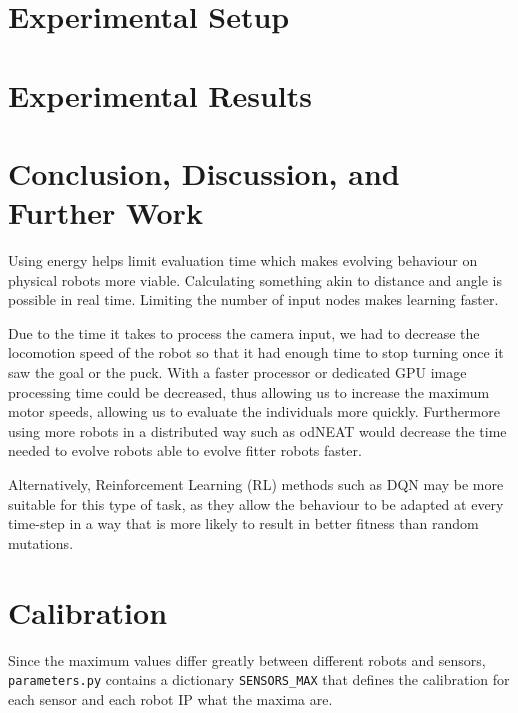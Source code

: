 \documentclass{article}
\begin{document}

	\section{Experimental Setup} %
	\label{sec:setup}


	\section{Experimental Results} %
	\label{sec:results}
	

	\section{Conclusion, Discussion, and Further Work} %
	\label{sec:conclusion}
	Using energy helps limit evaluation time which makes evolving behaviour on
	physical robots more viable.
	Calculating something akin to distance and angle is possible in real time.
	Limiting the number of input nodes makes learning faster. %

	Due to the time it takes to process the camera input, we had to decrease
	the locomotion speed of the robot so that it had enough time to stop
	turning once it saw the goal or the puck. With a faster processor or
	dedicated GPU image processing time could be decreased, thus allowing us to
	increase the maximum motor speeds, allowing us to evaluate the individuals
	more quickly.
	Furthermore using more robots in a distributed way such as
	odNEAT \cite{silva2012odneat} would decrease the time needed to evolve
	robots able to evolve fitter robots faster.

	Alternatively, Reinforcement Learning (RL) methods such as DQN
	\cite{mnih2013playing} may be more suitable for this type of task, as they
	allow the behaviour to be adapted at every time-step in a way that is more
	likely to result in better fitness than random mutations.

	\appendix

	\section{Calibration} %
	\label{apx:sec:calibration}
	Since the maximum values differ greatly between different robots and
	sensors, \texttt{parameters.py} contains a dictionary \texttt{SENSORS\_MAX}
	that defines the calibration for each sensor and each robot IP what the
	maxima are.
\end{document}
